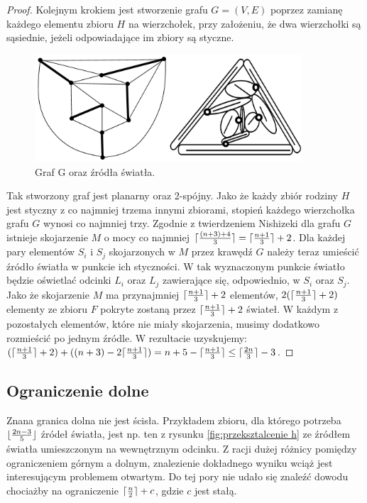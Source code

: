 \documentclass{xmgr}
\DeclarePairedDelimiter\ceil{\lceil}{\rceil}
\DeclarePairedDelimiter\floor{\lfloor}{\rfloor}
\theoremstyle{definition}
\begin{document}
\begin{proof}
\indent Kolejnym krokiem jest stworzenie grafu $G=(V,E)$ poprzez zamianę każdego elementu zbioru $H$ na wierzchołek, przy założeniu, że dwa wierzchołki są sąsiednie, jeżeli odpowiadające im zbiory są styczne.
\begin{figure}[ht!]
 \centering
  \includegraphics[height=4cm]{rysunki/skojarzenia_zrodla_swiatla.png}
  \caption{Graf G oraz źródła światła.}
\end{figure}
Tak stworzony graf jest planarny oraz 2-spójny. Jako że każdy zbiór rodziny $H$ jest styczny z co najmniej trzema innymi zbiorami, stopień każdego wierzchołka grafu $G$ wynosi co najmniej trzy. Zgodnie z twierdzeniem Nishizeki \cite{nishizeki} dla grafu $G$ istnieje skojarzenie $M$ o mocy co najmniej $\ceil{\frac{(n+3)+4}{3}} = \ceil{\frac{n+1}{3}}  + 2$. Dla każdej pary elementów $S_i$ i $S_j$ skojarzonych w $M$ przez krawędź $G$ należy teraz umieścić źródło światła w punkcie ich styczności. W tak wyznaczonym punkcie światło będzie oświetlać odcinki $L_i$ oraz $L_j$ zawierające się, odpowiednio, w $S_i$ oraz $S_j$. Jako że skojarzenie $M$ ma przynajmniej $\ceil{\frac{n+1}{3}} + 2$ elementów, $2(\ceil{\frac{n+1}{3}} + 2)$ elementy ze zbioru $F$ pokryte zostaną przez $\ceil{\frac{n+1}{3}} + 2$ świateł. W każdym z pozostałych elementów, które nie miały skojarzenia, musimy dodatkowo rozmieścić po jednym źródle. W rezultacie uzyskujemy:
$(\ceil{\frac{n+1}{3}} + 2) + ((n + 3)-2\ceil{\frac{n+1}{3}}) = n + 5-\ceil{\frac{n+1}{3}} \le \ceil{\frac{2n}{3}}-3$.
\end{proof}

\subsection{Ograniczenie dolne}
\indent Znana granica dolna nie jest ścisła. Przykładem zbioru, dla którego potrzeba $\floor{\frac{2n-3}{5}}$ źródeł światła, jest np. ten z rysunku \ref{fig:przeksztalcenie h} ze źródłem światła umieszczonym na wewnętrznym odcinku. Z racji dużej różnicy pomiędzy ograniczeniem górnym a dolnym, znalezienie dokładnego wyniku wciąż jest interesującym problemem otwartym. Do tej pory nie udało się znaleźć dowodu chociażby na ograniczenie $\ceil{\frac{n}{2}} + c$, gdzie $c$ jest stałą.
\end{document}
